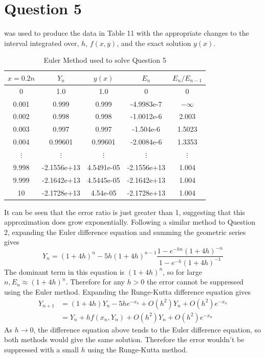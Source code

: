 \documentclass[10pt,a4paper,notitlepage]{article}
\begin{document}
\section*{\centering \large Question 5}
 was used to produce the data in Table 11 with the appropriate changes to the interval integrated over, $h$, $f(x,y)$, and the exact solution $y(x)$.
\begin{table}[H]
\centering
\begin{tabular}{|c|c|c|c|c|} \hline $x=0.2n$ & $Y_{n}$ & $y(x)$ & $E_{n}$ & $E_{n}/E_{n-1}$\\ \hline 0 & 1.0 & 1.0 & 0 & 0\\ 0.001 & 0.999 & 0.999 & -4.9983e-7 & $-\infty$ \\ 0.002 & 0.998 & 0.998 & -1.0012e-6 & 2.003\\ 0.003 & 0.997 & 0.997 & -1.504e-6 & 1.5023\\ 0.004 & 0.99601 & 0.99601 & -2.0084e-6 & 1.3353\\ 
$\vdots$&$\vdots$&$\vdots$&$\vdots$&$\vdots$\\
9.998 & -2.1556e+13  & 4.5491e-05 & -2.1556e+13  & 1.004\\
9.999 & -2.1642e+13   &4.5445e-05  &-2.1642e+13      &  1.004\\
           10  &-2.1728e+13 &    4.54e-05 & -2.1728e+13     &   1.004\\ \hline \end{tabular}
\caption{Euler Method used to solve Question 5}
\end{table}
It can be seen that the error ratio is just greater than 1,  suggesting that this approximation does grow exponentially.  Following a similar method to Question 2, expanding the Euler difference equation and summing the geometric series gives
\begin{equation}
Y_{n}=\left( 1+4h\right) ^{n} -5h \left( 1+4h \right) ^{n-1} \frac{1-e^{-hn}\left( 1+4h\right) ^{-n}}{1-e^{-h}\left( 1+4h \right)^{-1}}
\end{equation}
The dominant term in this equation is $(1+4h)^{n}$, so for large $n,  E_{n}\approx (1+4h)^{n}$. Therefore for any $h>0$ the error cannot be suppressed using the Euler method.  Expanding the Runge-Kutta difference equation gives
\begin{equation}
\begin{aligned}
Y_{n+1} &= \left(1+4h\right)Y_{n}-5he^{-x_{n}}+O(h^{2})Y_{n}+O(h^{2})e^{-x_{n}}\\
&= Y_{n} + hf\left( x_{n},Y_{n}\right) +O(h^{2})Y_{n}+O(h^{2})e^{-x_{n}}
\end{aligned}
\end{equation}
As $h\rightarrow 0$, the difference equation above tends to the Euler difference equation, so both methods would give the same solution. Therefore the error wouldn't be suppressed with a small $h$ using the Runge-Kutta method.
\end{document}
